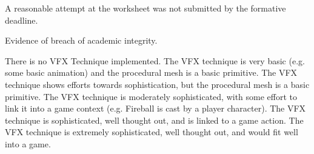 \documentclass{../../../fal_assignment}
\begin{document}
\begin{markingrubric}

		\grade\fail	A reasonable attempt at the worksheet was not submitted by the formative deadline.
		\par Evidence of breach of academic integrity.
		
	\grade\fail There is no VFX Technique implemented.
		\grade The VFX technique is very basic (e.g. some basic animation) and the procedural mesh is a basic primitive.
		\grade The VFX technique shows efforts towards sophistication, but the procedural mesh is a basic primitive.
		\grade The VFX technique is moderately sophisticated, with some effort to link it into a game context (e.g. Fireball is cast by a player character).
		\grade The VFX technique is sophisticated, well thought out, and is linked to a game action.
		\grade The VFX technique is extremely sophisticated, well thought out, and would fit well into a game.


\end{markingrubric}
\end{document}
